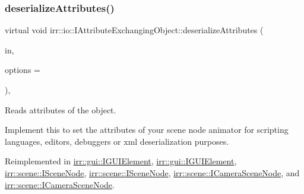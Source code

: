 \mbox{\label{classirr_1_1io_1_1IAttributeExchangingObject_a013d4ead3736d7fab4bc18c2d61a3e2e}} 
\subsubsection{\texorpdfstring{deserialize\+Attributes()}{deserializeAttributes()}\hspace{0.1cm}{\footnotesize\ttfamily [2/2]}}
{\footnotesize\ttfamily virtual void irr\+::io\+::\+I\+Attribute\+Exchanging\+Object\+::deserialize\+Attributes (\begin{DoxyParamCaption}\item[{\hyperlink{classirr_1_1io_1_1IAttributes}{io\+::\+I\+Attributes} $\ast$}]{in,  }\item[{\hyperlink{structirr_1_1io_1_1SAttributeReadWriteOptions}{io\+::\+S\+Attribute\+Read\+Write\+Options} $\ast$}]{options = {} }\end{DoxyParamCaption})\hspace{0.3cm}{\ttfamily [inline]}, {\ttfamily [virtual]}}



Reads attributes of the object. 

Implement this to set the attributes of your scene node animator for scripting languages, editors, debuggers or xml deserialization purposes. 

Reimplemented in \hyperlink{classirr_1_1gui_1_1IGUIElement_af71b96163b8d95816cd9c80fbf413b4d}{irr\+::gui\+::\+I\+G\+U\+I\+Element}, \hyperlink{classirr_1_1gui_1_1IGUIElement_af71b96163b8d95816cd9c80fbf413b4d}{irr\+::gui\+::\+I\+G\+U\+I\+Element}, \hyperlink{classirr_1_1scene_1_1ISceneNode_a5fb609b08fc89a92f928c19ce3b181eb}{irr\+::scene\+::\+I\+Scene\+Node}, \hyperlink{classirr_1_1scene_1_1ISceneNode_a5fb609b08fc89a92f928c19ce3b181eb}{irr\+::scene\+::\+I\+Scene\+Node}, \hyperlink{classirr_1_1scene_1_1ICameraSceneNode_a0df881cb5e2a55562399281061151ae8}{irr\+::scene\+::\+I\+Camera\+Scene\+Node}, and \hyperlink{classirr_1_1scene_1_1ICameraSceneNode_a0df881cb5e2a55562399281061151ae8}{irr\+::scene\+::\+I\+Camera\+Scene\+Node}.

\mbox{\label{classirr_1_1io_1_1IAttributeExchangingObject_a587f7b633366968f0488e1099e9172ef}} 

